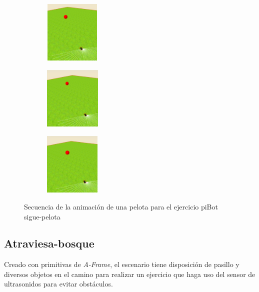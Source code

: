 \begin{figure}[htbp]
\begin{subfigure}[t]{0.2\textwidth}
    \includegraphics[width=3cm, height=3cm]{img/BallPibot7.png}
\label{fig:figure1_7}
\end{subfigure}\hfill
\begin{subfigure}[t]{0.2\textwidth}
    \includegraphics[width=3cm, height=3cm]{img/BallPibot8.png}
\label{fig:figure1_8}
\end{subfigure}\hfill
\begin{subfigure}[t]{0.2\textwidth}
    \includegraphics[width=3cm, height=3cm]{img/BallPibot9.png}
\label{fig:figure1_9}
\end{subfigure}
\caption{Secuencia de la animación de una pelota para el ejercicio piBot sigue-pelota}
\label{fig:secuenciaPibot}
\end{figure}

\subsection{Atraviesa-bosque}
Creado con primitivas de \textit{A-Frame}, el escenario tiene disposición de pasillo y diversos objetos en el camino para realizar un ejercicio que haga uso del sensor de ultrasonidos para evitar obstáculos.

